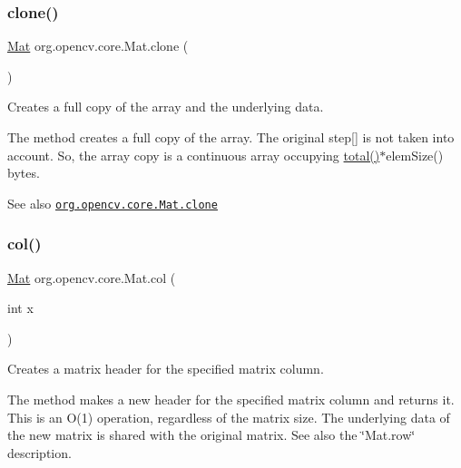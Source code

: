 \mbox{\label{classorg_1_1opencv_1_1core_1_1_mat_a7e40ecb438d2ec75e24e209b7bee0be2}} 
\subsubsection{\texorpdfstring{clone()}{clone()}}
{\footnotesize\ttfamily \mbox{\hyperlink{classorg_1_1opencv_1_1core_1_1_mat}{Mat}} org.\+opencv.\+core.\+Mat.\+clone (\begin{DoxyParamCaption}{ }\end{DoxyParamCaption})}

Creates a full copy of the array and the underlying data.

The method creates a full copy of the array. The original {\ttfamily step\mbox{[}\mbox{]}} is not taken into account. So, the array copy is a continuous array occupying {\ttfamily \mbox{\hyperlink{classorg_1_1opencv_1_1core_1_1_mat_a0aa57e546fe72e994dafe806f47f0081}{total()}}$\ast$elem\+Size()} bytes.

\begin{DoxySeeAlso}{See also}
\href{http://docs.opencv.org/modules/core/doc/basic_structures.html#mat-clone}{\tt org.\+opencv.\+core.\+Mat.\+clone} 
\end{DoxySeeAlso}
\mbox{\label{classorg_1_1opencv_1_1core_1_1_mat_ad1aa7a61ef1c57251d8d4031c541d5f2}} 
\subsubsection{\texorpdfstring{col()}{col()}}
{\footnotesize\ttfamily \mbox{\hyperlink{classorg_1_1opencv_1_1core_1_1_mat}{Mat}} org.\+opencv.\+core.\+Mat.\+col (\begin{DoxyParamCaption}\item[{int}]{x }\end{DoxyParamCaption})}

Creates a matrix header for the specified matrix column.

The method makes a new header for the specified matrix column and returns it. This is an O(1) operation, regardless of the matrix size. The underlying data of the new matrix is shared with the original matrix. See also the \char`\"{}\+Mat.\+row\char`\"{} description.


